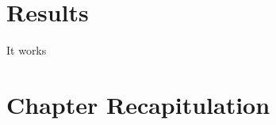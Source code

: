 \documentclass[thesis-solanki.tex]{subfiles}
\begin{document}

\section{Results}

It works



\section{Chapter Recapitulation}

\ifMain
\begin{scope}
  \nolinenumbers
  \enotesize
  \par
  \begin{singlespace}
  \setlength{\parskip}{12pt plus 2pt minus 1pt}
  \theendnotes
  \par
  \end{singlespace}
\end{scope}
\fi
\end{document}
